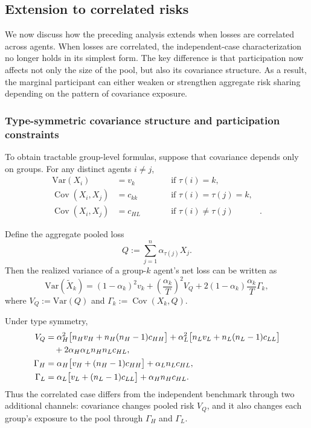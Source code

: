 \documentclass[a4paper,12pt]{article}
\theoremstyle{definition}
\theoremstyle{remark}
\DeclareMathOperator{\Cov}{Cov}
\newcommand{\Var}{\mathrm{Var}}
\newcommand{\1}{\mathbf{1}}
\begin{document}
\subsection{Extension to correlated risks}\label{sec:correlated}

We now discuss how the preceding analysis extends when losses are correlated
across agents. When losses are correlated, the independent-case characterization no longer holds in its simplest form. The key difference is that participation now affects not only the size of the pool, but also its covariance structure. As a result, the marginal participant can either weaken or strengthen aggregate risk sharing depending on the pattern of covariance exposure.

\subsubsection{Type-symmetric covariance structure and participation constraints}

To obtain tractable group-level formulas, suppose that covariance depends only on
groups. For any distinct agents \(i\neq j\),
\begin{align*}
\Var(X_i)&=v_k
&&\text{if }\tau(i)=k,\\
\Cov(X_i,X_j)&=c_{kk}
\qquad&&\text{if }\tau(i)=\tau(j)=k,\\
\Cov(X_i,X_j)&=c_{HL}
\qquad&&\text{if }\tau(i)\neq\tau(j)&.
\end{align*}

Define the aggregate pooled loss
\[
Q:=\sum_{j=1}^n \alpha_{\tau(j)}X_j.
\]
Then the realized variance of a group-\(k\) agent's net loss can be written as
\[
\Var(\tilde X_k)
=
(1-\alpha_k)^2v_k
+
\left(\frac{\alpha_k}{T}\right)^2V_Q
+
2(1-\alpha_k)\frac{\alpha_k}{T}\Gamma_k,
\]
where
$V_Q:=\Var(Q)$ and $\Gamma_k:=\Cov(X_k,Q)$.

Under type symmetry,
\begin{align*}
V_Q
&=
\alpha_H^2\bigl[n_Hv_H+n_H(n_H-1)c_{HH}\bigr]
+
\alpha_L^2\bigl[n_Lv_L+n_L(n_L-1)c_{LL}\bigr]
\notag\\
&\quad
+
2\alpha_H\alpha_Ln_Hn_Lc_{HL},
\label{eq:VQ-corr-new}
\\
\Gamma_H
&=
\alpha_H\bigl[v_H+(n_H-1)c_{HH}\bigr]+\alpha_Ln_Lc_{HL},
\\
\Gamma_L
&=
\alpha_L\bigl[v_L+(n_L-1)c_{LL}\bigr]+\alpha_Hn_Hc_{HL}.
\end{align*}
Thus the correlated case differs from the independent benchmark through two
additional channels: covariance changes pooled risk \(V_Q\), and it also
changes each group's exposure to the pool through \(\Gamma_H\) and \(\Gamma_L\).
\end{document}
